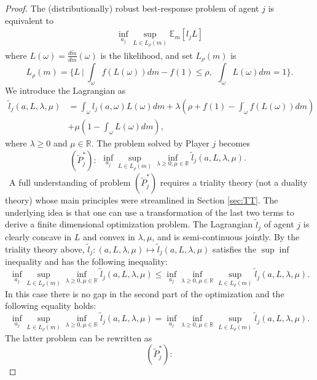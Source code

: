\documentclass{article}
\begin{document}
\begin{proof}
The (distributionally) robust best-response problem of agent $j$ is equivalent to
\begin{equation}\label{eq022}
\begin{array}{l}
\inf_{a_j} \sup_{L\in L_{\rho}(m)} \mathbb{E}_{m} [l_j L]
\end{array}
\end{equation}
where $L(\omega)=\frac{d\tilde{m}}{dm}(\omega)$ is the likelihood, and set $L_{\rho}(m)$ is
$$L_{\rho}(m)=\{ L\  | \   \int_{\omega}  f(L(\omega)) d{m} -f(1)\leq \rho,\ \  \int_{\omega} L(\omega)dm=1\}.
$$
We introduce the Lagrangian as
$$\begin{array}{ll}
\tilde{l}_j(a,L,\lambda,\mu) &= \int_{\omega} l_j(a,\omega) L(\omega) dm + \lambda(\rho+f(1) - \int_{\omega}  f(L(\omega)) d{m}) \\
&+ \mu(1-\int_{\omega} L(\omega)dm),
\end{array}
$$
where $\lambda \geq 0$ and $\mu\in \mathbb{R}$. The problem solved by Player $j$ becomes
\begin{equation}\label{eq02} (\tilde{P}^*_j):
\begin{array}{l}
\inf_{a_j} \sup_{L\in L_{\rho}(m)}\inf_{\lambda\geq 0,\mu\in \mathbb{R}} \tilde{l}_j(a,L,\lambda,\mu).
\end{array}
\end{equation}\
A full understanding of problem $(\tilde{P}^*_j)$ requires a triality theory (not a duality theory) whose main principles were streamlined in Section \ref{sec:TT}. The underlying idea is that one can use a transformation of the last two terms to derive a finite dimensional optimization problem. The Lagrangian $\tilde{l}_j$ of agent $j$  is clearly concave in $L$ and convex in $\lambda,\mu$, and is semi-continuous jointly. By the triality theory above, $\tilde{l}_j: (a,L,\lambda,\mu) \mapsto \tilde{l}_j(a,L,\lambda,\mu)$ satisfies the $\sup\inf$ inequality and has the following inequality:
$$\inf_{a_j} \sup_{L\in L_{\rho}(m)}\inf_{\lambda\geq 0,\mu\in \mathbb{R}} \tilde{l}_j(a,L,\lambda,\mu)
\leq \inf_{a_j}\inf_{\lambda\geq 0,\mu\in \mathbb{R}}  \sup_{L\in L_{\rho}(m)}\tilde{l}_j(a,L,\lambda,\mu).
$$
In this case there is no gap in the second part of the optimization and the following equality holds:
$$\inf_{a_j} \sup_{L\in L_{\rho}(m)}\inf_{\lambda\geq 0,\mu\in \mathbb{R}} \tilde{l}_j(a,L,\lambda,\mu)
=\inf_{a_j}\inf_{\lambda\geq 0,\mu\in \mathbb{R}} \sup_{L\in L_{\rho}(m)}\tilde{l}_j(a,L,\lambda,\mu).
$$
The latter problem can be rewritten as
\begin{equation}\label{eq04} (\tilde{P}^*_j):

\end{equation}
\end{proof}
\end{document}
